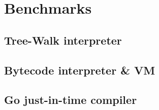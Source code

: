 \chapter{Benchmarks}
\section{Tree-Walk interpreter}
\section{Bytecode interpreter \& VM}
\section{Go just-in-time compiler}
